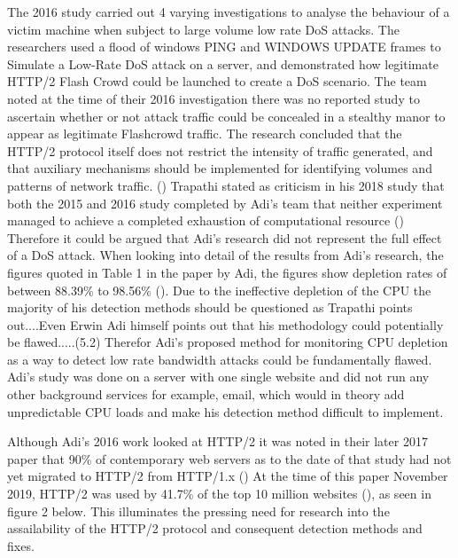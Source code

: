 The 2016 study carried out 4 varying investigations to analyse the behaviour of a victim machine when subject to large volume low rate DoS attacks. The researchers used a flood of windows PING and WINDOWS UPDATE frames to Simulate a Low-Rate DoS attack on a server, and demonstrated how legitimate HTTP/2 Flash Crowd could be launched to create a DoS scenario.  The team noted at the time of their 2016 investigation there was no reported study to ascertain whether or not attack traffic could be concealed in a stealthy manor to appear as legitimate Flashcrowd traffic. The research concluded that the HTTP/2 protocol itself does not restrict the intensity of traffic generated, and that auxiliary mechanisms should be implemented for identifying volumes and patterns of network traffic. (\cite{Adi2016}) Trapathi stated as criticism in his 2018 study that both the 2015 and 2016 study completed by Adi's team that neither experiment managed to achieve a completed exhaustion of computational resource (\cite{tripathi2018slow}) Therefore it could be argued that Adi's research did not represent the full effect of a DoS attack. When looking into detail of the results from Adi's research, the figures quoted in Table 1 in the paper by Adi, the figures show depletion rates of between 88.39\% to 98.56\% (\cite{Adi2016}). Due to the ineffective depletion of the CPU the majority of his detection methods should be questioned as Trapathi points out....Even Erwin Adi himself points out that his methodology could potentially be flawed.....(5.2) Therefor Adi's proposed method for monitoring CPU depletion as a way to detect low rate bandwidth attacks could be fundamentally flawed. Adi's study was done on a server with one single website and did not run any other background services for example, email, which would in theory add unpredictable CPU loads and make his detection method difficult to implement.

Although Adi's 2016 work looked at HTTP/2 it was noted in their later 2017 paper that 90\% of contemporary web servers as to the date of that study had not yet migrated to HTTP/2 from HTTP/1.x (\cite{adi2017stealthy}) At the time of this paper November 2019, HTTP/2 was used by 41.7\% of the top 10 million websites (\cite{w3techs}), as seen in figure 2 below. This illuminates the pressing need for research into the assailability of the HTTP/2 protocol and consequent detection methods and fixes. 

